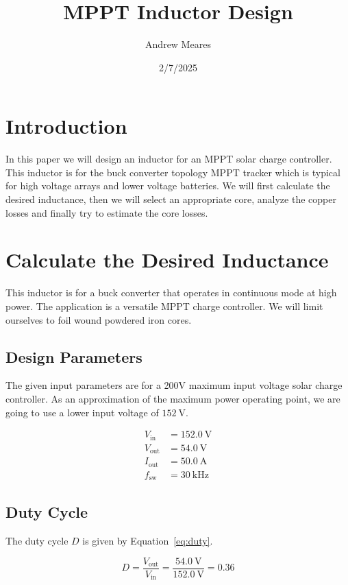 \documentclass{article}
\title{MPPT Inductor Design}
\author{Andrew Meares}
\date{2/7/2025}
\begin{document}
\maketitle

\section{Introduction}
In this paper we will design an inductor for an MPPT solar charge controller.
This inductor is for the buck converter topology MPPT tracker which is typical for high voltage arrays and lower voltage batteries.
We will first calculate the desired inductance, then we will select an appropriate core, analyze the copper losses and finally try to estimate the core losses.

\section{Calculate the Desired Inductance}

This inductor is for a buck converter that operates in continuous mode at high power.
The application is a versatile MPPT charge controller.
We will limit ourselves to foil wound powdered iron cores.

\subsection{Design Parameters}
The given input parameters are for a 200V maximum input voltage solar charge controller.  As an approximation of the maximum power operating point, we are going to use a lower input voltage of $\SI{152}{\volt}$.

\begin{align*}
    V_{\text{in}} &= \SI{152.0}{\volt} \\
    V_{\text{out}} &= \SI{54.0}{\volt} \\
    I_{\text{out}} &= \SI{50.0}{\ampere} \\
    f_{\text{sw}} &= \SI{30}{\kilo\hertz}
\end{align*}

\subsection{Duty Cycle}

The duty cycle \( D \) is given by Equation~\eqref{eq:duty}.

\begin{equation}
\label{eq:duty}
    D = \frac{V_{\text{out}}}{V_{\text{in}}} = \frac{\SI{54.0}{\volt}}{\SI{152.0}{\volt}} = \num{0.36}
\end{equation}
\end{document}
